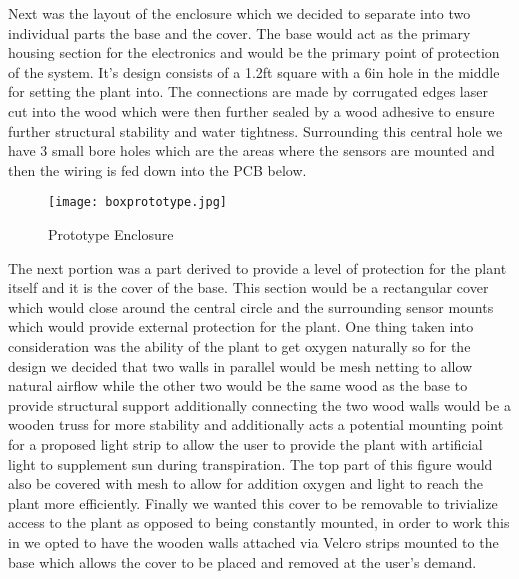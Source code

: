 \documentclass[comsoc, 12pt]{IEEEtran}
\begin{document}
Next was the layout of the enclosure which we decided to separate into two individual parts the base and the cover. The base would act as the primary housing section for the electronics and would be the primary point of protection of the system. It's design consists of a 1.2ft square  with a 6in hole in the middle for setting the plant into. The connections are made by corrugated edges laser cut into the wood which were then further sealed by a wood adhesive to ensure further structural stability and water tightness. Surrounding this central hole we have 3 small bore holes which are the areas where the sensors are mounted and then the wiring is fed down into the PCB below. \par 
\begin{figure}[h!]
\centering
\texttt{[image: boxprototype.jpg]}
\centering
\caption{Prototype Enclosure}
 \label{fig:Base Figure}
\end{figure}
The next portion was a part derived to provide a level of protection for the plant itself and it is the cover of the base. This section would be a rectangular cover which would close around the central circle and the surrounding sensor mounts which would provide external protection for the plant. One thing taken into consideration was the ability of the plant to get oxygen naturally so for the design we decided that two walls in parallel would be mesh netting to allow natural airflow while the other two would be the same wood as the base to provide structural support additionally connecting the two wood walls would be a wooden truss for more stability and additionally acts a potential mounting point for a proposed light strip to allow the user to provide the plant with artificial light to supplement sun during transpiration. The top part of this figure would also be covered with mesh to allow for addition oxygen and light to reach the plant more efficiently. Finally we wanted this cover to be removable to trivialize access to the plant as opposed to being constantly mounted, in order to work this in we opted to have the wooden walls attached via Velcro strips mounted to the base which allows the cover to be placed and removed at the user's demand.    
\end{document}

